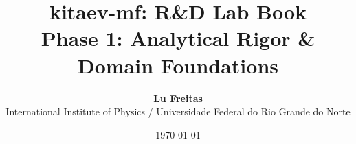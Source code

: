 \documentclass[11pt,a4paper,oneside]{memoir}
\title{\Huge\bfseries\color{labbookaccent} kitaev-mf: R\&D Lab Book\\[4mm]
\Large Phase 1: Analytical Rigor \& Domain Foundations}
\author{\textbf{Lu Freitas}\\[1mm]
International Institute of Physics / Universidade Federal do Rio Grande do Norte}
\date{\today}
\begin{document}
\frontmatter
\maketitle
\tableofcontents*

\mainmatter













\appendix

\end{document}
